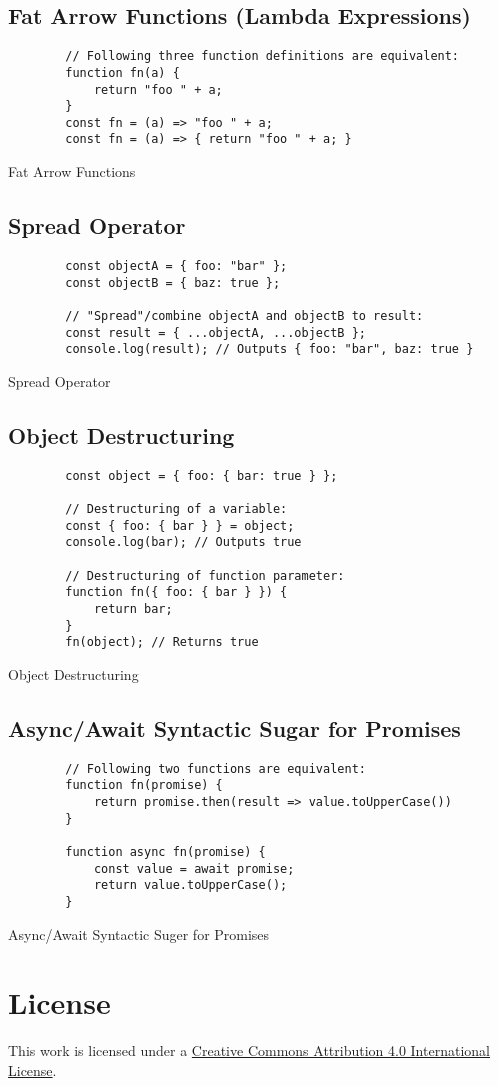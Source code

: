 \documentclass[12pt,a4paper]{article}
\begin{document}
\subsection{Fat Arrow Functions (Lambda Expressions)}
\begin{listing}[H]
	\begin{verbatim}
		// Following three function definitions are equivalent:
		function fn(a) {
			return "foo " + a;
		}
		const fn = (a) => "foo " + a;
		const fn = (a) => { return "foo " + a; }
	\end{verbatim}
	\caption{Fat Arrow Functions}
\end{listing}

\subsection{Spread Operator}
\begin{listing}[H]
	\begin{verbatim}
		const objectA = { foo: "bar" };
		const objectB = { baz: true };

		// "Spread"/combine objectA and objectB to result:
		const result = { ...objectA, ...objectB };
		console.log(result); // Outputs { foo: "bar", baz: true }
	\end{verbatim}
	\caption{Spread Operator}
\end{listing}

\subsection{Object Destructuring}
\begin{listing}[H]
	\begin{verbatim}
		const object = { foo: { bar: true } };

		// Destructuring of a variable:
		const { foo: { bar } } = object;
		console.log(bar); // Outputs true

		// Destructuring of function parameter:
		function fn({ foo: { bar } }) {
			return bar;
		}
		fn(object); // Returns true
	\end{verbatim}
	\caption{Object Destructuring}
\end{listing}

\subsection{Async/Await Syntactic Sugar for Promises}
\begin{listing}[H]
	\begin{verbatim}
		// Following two functions are equivalent:
		function fn(promise) {
			return promise.then(result => value.toUpperCase())
		}

		function async fn(promise) {
			const value = await promise;
			return value.toUpperCase();
		}
	\end{verbatim}
	\caption{Async/Await Syntactic Suger for Promises}
\end{listing}





\section*{License}
\ccby\thinspace\thinspace This work is licensed under a \href{https://creativecommons.org/licenses/by/4.0/}{Creative Commons Attribution 4.0 International License}.
\end{document}
